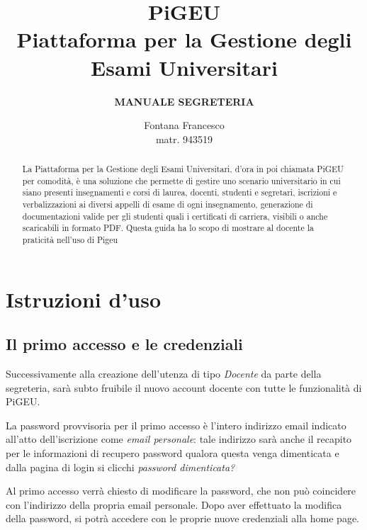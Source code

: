 \documentclass{article}
\title{PiGEU\\ Piattaforma per la Gestione degli Esami Universitari}
\author{\textbf{MANUALE SEGRETERIA}}
\date{Fontana Francesco \\ matr. 943519}
\begin{document}
    \maketitle

    \begin{abstract}

        La Piattaforma per la Gestione degli Esami Universitari, d'ora in poi chiamata PiGEU per comodità, è una soluzione che permette di gestire
        uno scenario universitario in cui siano presenti insegnamenti e corsi di laurea, docenti, studenti e segretari, iscrizioni e verbalizzazioni
        ai diversi appelli di esame di ogni insegnamento, generazione di documentazioni valide per gli studenti quali i certificati di carriera, visibili
        o anche scaricabili in formato PDF.
        Questa guida ha lo scopo di mostrare al docente la praticità nell'uso di Pigeu
    \end{abstract}

    \pagebreak

    \tableofcontents

    \pagebreak
    \section{Istruzioni d'uso}
    \subsection{Il primo accesso e le credenziali}
    Successivamente alla creazione dell'utenza di tipo \textit{Docente} da parte della segreteria, sarà subto fruibile il nuovo account docente con tutte le funzionalità di PiGEU.

    La password provvisoria per il primo accesso è l'intero indirizzo email indicato all'atto dell'iscrizione come \textit{email personale}: tale indirizzo sarà anche il recapito per le informazioni di recupero password qualora questa venga dimenticata e dalla pagina di login si clicchi \textit{password dimenticata?}

    Al primo accesso verrà chiesto di modificare la password, che non può coincidere con l'indirizzo della propria email personale. Dopo aver effettuato la modifica della password, si potrà accedere con le proprie nuove credenziali alla home page.
\end{document}
